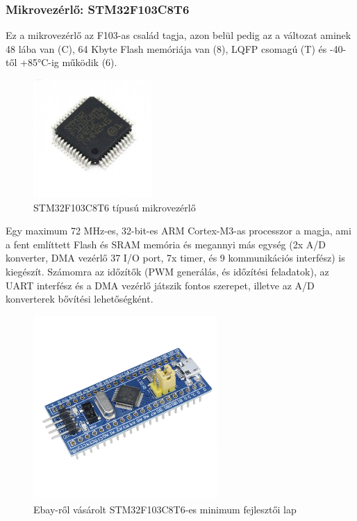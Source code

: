 \documentclass[../main.tex]{subfiles}
\begin{document}
        \subsubsection{Mikrovezérlő: STM32F103C8T6}
            Ez a mikrovezérlő az F103-as család tagja, azon belül pedig az a változat aminek 48 lába van (C), 64 Kbyte Flash memóriája van (8), LQFP csomagú (T) és -40-től +85°C-ig működik (6). \cite{ds_stm32}
            
            \begin{figure}[h!]
                \centering
                    \includegraphics[width=4.5cm]{resources/pcb_res/stm32f103c8t6.jpg}
                \caption{STM32F103C8T6 típusú mikrovezérlő\cite{sec_204}}
                \label{fig:stm32f103_ic}
            \end{figure}
            
            Egy maximum 72 MHz-es, 32-bit-es ARM Cortex-M3-as processzor a magja, ami a fent említtett Flash és SRAM memória és megannyi más egység (2x A/D konverter, DMA vezérlő 37 I/O port, 7x timer, és 9 kommunikációs interfész) is kiegészít. Számomra az időzítők (PWM generálás, és időzítési feladatok), az UART interfész és a DMA vezérlő játszik fontos szerepet, illetve az A/D konverterek bővítési lehetőségként.
            
            \begin{figure}[h!]
                \centering
                    \includegraphics[width=7cm]{resources/pcb_res/stm32f103c8t6_minimum_dev_board.jpg}
                \caption{Ebay-ről vásárolt STM32F103C8T6-es minimum fejlesztői lap\cite{sec_205}}
                \label{fig:stm32f103_dev_board}
            \end{figure}

\newpage
\end{document}
